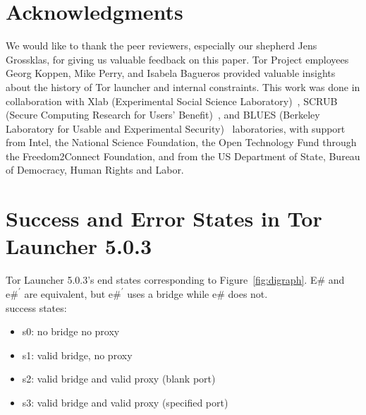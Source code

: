 \documentclass[USenglish,oneside,twocolumn]{article}
\begin{document}
\section {Acknowledgments}
We would like to thank the peer reviewers, especially our shepherd Jens Grossklas, for giving us valuable feedback on this paper. Tor Project employees Georg Koppen, Mike Perry, and Isabela Bagueros provided valuable insights about the history of Tor launcher and internal constraints. This work was done in collaboration with Xlab (Experimental Social Science Laboratory)~\cite{xlab}, SCRUB (Secure Computing Research for Users' Benefit)~\cite{scrub}, and BLUES (Berkeley Laboratory for Usable and Experimental Security)~\cite{blues} laboratories, with support from
Intel, the National Science Foundation,
the Open Technology Fund through the Freedom2Connect Foundation, and from
the US Department of State, Bureau of Democracy, Human Rights and Labor.




\appendix

\section{Success and Error States in Tor Launcher 5.0.3} 
\label{states} 
Tor Launcher 5.0.3's end states corresponding to Figure~\ref{fig:digraph}. E\# and $\mbox{e\#}^\prime$ are equivalent, but $\mbox{e\#}^\prime$ uses a bridge while e\# does not. \\

\noindent success states: 
\begin{itemize}
\item s0: no bridge no proxy
\item s1: valid bridge, no proxy
\item s2: valid bridge and valid proxy (blank port)
\item s3: valid bridge and valid proxy (specified port)
\end{itemize}
\end{document}
